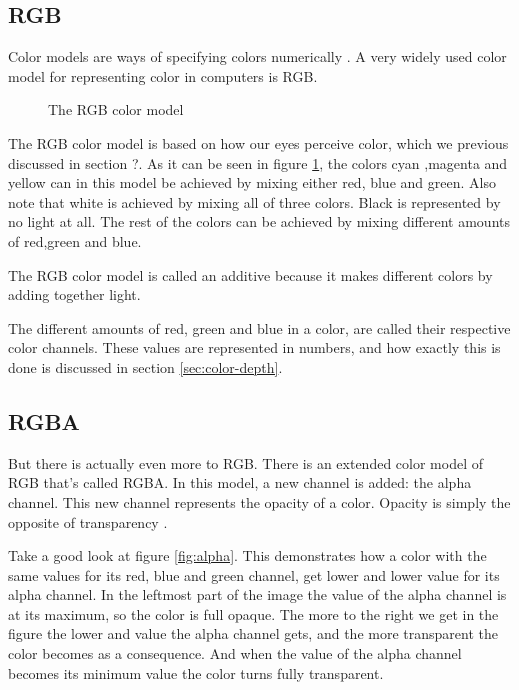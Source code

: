 \subsection{RGB}
\label{sec:rgb}

Color models are ways of specifying colors
numerically
\cite{hearn1997computer_graphics,Pascale2003_ReviewRGBColourSpaces}. A
very widely used color model for representing color in computers is
RGB.

\begin{figure}
  \centering
  \caption{The RGB color model}
  \label{fig:rgb}
\end{figure}

The RGB color model is based on how our eyes perceive color, which we
previous discussed in section ?. As it can be seen in figure
\ref{fig:rgb}, the colors cyan ,magenta and yellow can in this model
be achieved by mixing either red, blue and green. Also note that white
is achieved by mixing all of three colors. Black is represented by no
light at all. The rest of the colors can be achieved by mixing
different amounts of red,green and blue.

The RGB color model is called an additive
because it makes different colors by adding together light.

The different amounts of red, green and blue in a color, are called
their respective color channels. These values are
represented in numbers, and how exactly this is done is discussed in
section \ref{sec:color-depth}.

\subsection{RGBA}


But there is actually even more to RGB. There is an extended color
model of RGB that's called RGBA. In this model, a new channel is
added: the alpha channel. This new channel
represents the opacity of a color. Opacity is simply the opposite of
transparency \cite{porter84_compos_dig_img,murray1996encyclopedia,niederst1999webdesign}.

Take a good look at figure \ref{fig:alpha}. This demonstrates how a
color with the same values for its red, blue and green channel, get
lower and lower value for its alpha channel. In the leftmost part of
the image the value of the alpha channel is at its maximum, so the
color is full opaque. The more to the right we get in the figure the
lower and value the alpha channel gets, and the more transparent the
color becomes as a consequence. And when the value of the alpha
channel becomes its minimum value the color turns fully transparent.

